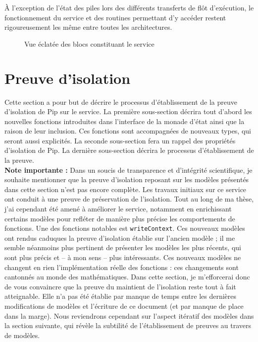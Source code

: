 		\newpage

		À l'exception de l'état des piles lors des différents transferts de flôt d'exécution, le fonctionnement du service et des routines permettant d'y accéder restent rigoureusement les même entre toutes les architectures.

		\begin{figure}[!b]
			
			\caption{Vue éclatée des blocs constituant le service}
			\label{fig:callgraph}
		\end{figure}
		\newpage
	\section{Preuve d'isolation}

		Cette section a pour but de décrire le processus d'établissement de la preuve d'isolation de Pip sur le service. La première sous-section décrira tout d'abord les nouvelles fonctions introduites dans l'interface de la monade d'état ainsi que la raison de leur inclusion. Ces fonctions sont accompagnées de nouveaux types, qui seront aussi explicités. La seconde sous-section fera un rappel des propriétés d'isolation de Pip. La dernière sous-section décrira le processus d'établissement de la preuve.\\

		\textbf{Note importante :} Dans un soucis de transparence et d'intégrité scientifique, je souhaite mentionner que la preuve d'isolation reposant sur les modèles présentés dans cette section n'est pas encore complète. Les travaux initiaux sur ce service ont conduit à une preuve de préservation de l'isolation. Tout au long de ma thèse, j'ai cependant été amené à améliorer le service, notamment en enrichissant certains modèles pour refléter de manière plus précise les comportements de fonctions. Une des fonctions notables est \texttt{writeContext}. Ces nouveaux modèles ont rendus caduques la preuve d'isolation établie sur l'ancien modèle ; il me semble néanmoins plus pertinent de présenter les modèles les plus récents, qui sont plus précis et -- à mon sens -- plus intéressants. Ces nouveaux modèles ne changent en rien l'implémentation réelle des fonctions : ces changements sont cantonnés au monde des mathématiques. Dans cette section, je m'efforcerai donc de vous convaincre que la preuve du maintient de l'isolation reste tout à fait atteignable. Elle n'a pas été établie par manque de temps entre les dernières modifications de modèles et l'écriture de ce document (et par manque de place dans la marge). Nous reviendrons cependant sur l'aspect itératif des modèles dans la section suivante, qui révèle la subtilité de l'établissement de preuves au travers de modèles.

